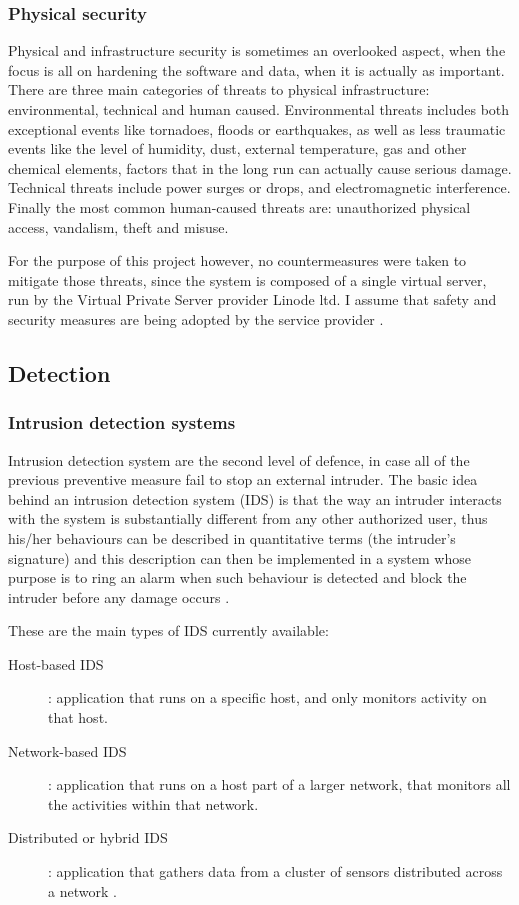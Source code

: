 \subsubsection{Physical security}
Physical and infrastructure security is sometimes an overlooked aspect, when the
focus is all on hardening the software and data, when it is actually as
important. There are three main categories of threats to physical
infrastructure: environmental, technical and human caused. Environmental threats
includes both exceptional events like tornadoes, floods or earthquakes, as well
as less traumatic events like the level of humidity, dust, external temperature, gas
and other chemical elements, factors that in the long run can actually cause
serious damage. Technical threats include power surges or drops, and
electromagnetic interference. Finally the most common human-caused threats are:
unauthorized physical access, vandalism, theft and misuse.

For the purpose of this project however, no countermeasures were taken to
mitigate those threats, since the system is composed of a single virtual server,
run by the Virtual Private Server provider Linode ltd. I assume that safety and
security measures are being adopted by the service provider \cite{WS15}.

\subsection{Detection}

\subsubsection{Intrusion detection systems}
Intrusion detection system are the second level of defence, in case all
of the previous preventive measure fail to stop an external intruder. The basic
idea behind an intrusion detection system (IDS) is that the way an intruder
interacts with the system is substantially different from any other authorized
user, thus his/her behaviours can be described in quantitative terms (the
intruder's signature) and this description can then be implemented in a system
whose purpose is to ring an alarm when such behaviour is detected and block the
intruder before any damage occurs \cite{WS15}.

These are the main types of IDS currently available:
\begin{description}
  \item[Host-based IDS]: application that runs on a specific host, and only
  monitors activity on that host.
  \item[Network-based IDS]: application that runs on a host part of a larger
  network, that monitors all the activities within that network.
  \item[Distributed or hybrid IDS]: application that gathers data from a
  cluster of sensors distributed across a network \cite{RS00}.
\end{description}

